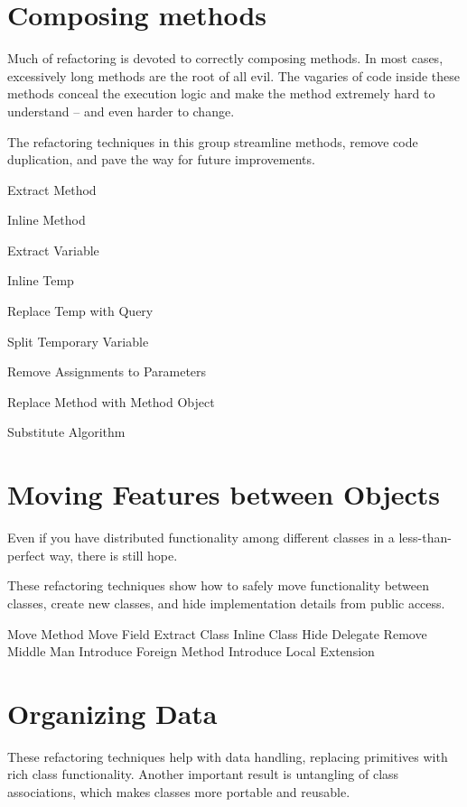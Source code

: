 \documentclass[11pt,a4paper,oneside]{book}
\begin{document}
\section{Composing methods}

Much of refactoring is devoted to correctly composing methods. In most cases, excessively long methods are the root of all evil. The vagaries of code inside these methods conceal the execution logic and make the method extremely hard to understand – and even harder to change.

The refactoring techniques in this group streamline methods, remove code duplication, and pave the way for future improvements.

    Extract Method
    
    
    Inline Method

    
    
    Extract Variable
    
    
    Inline Temp
    
    
    Replace Temp with Query
    
    Split Temporary Variable
    
    Remove Assignments to Parameters
    
    Replace Method with Method Object
    
    Substitute Algorithm


\section{Moving Features between Objects}

Even if you have distributed functionality among different classes in a less-than-perfect way, there is still hope.

These refactoring techniques show how to safely move functionality between classes, create new classes, and hide implementation details from public access.

    Move Method
    Move Field
    Extract Class
    Inline Class
    Hide Delegate
    Remove Middle Man
    Introduce Foreign Method
    Introduce Local Extension



\section{Organizing Data}

These refactoring techniques help with data handling, replacing primitives with rich class functionality. Another important result is untangling of class associations, which makes classes more portable and reusable.
\end{document}
